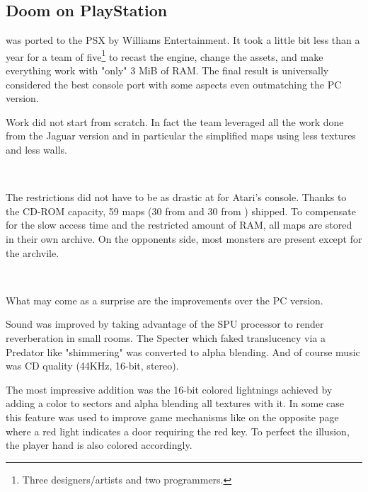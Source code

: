 \subsection{Doom on PlayStation}
\doom{} was ported to the PSX by Williams Entertainment. It took a little bit less than a year for a team of five\footnote{Three designers/artists and two programmers.} to recast the engine, change the assets, and make everything work with "only" 3 MiB of RAM. The final result is universally considered the best console port with some aspects even outmatching the PC version.\\
\par
Work did not start from scratch. In fact the team leveraged all the work done from the Jaguar version and in particular the simplified maps using less textures and less walls.\\
\par
{}\\
\par
  The restrictions did not have to be as drastic at for Atari's console. Thanks to the CD-ROM capacity, 59 maps (30 from \doom{} and 30 from \doomii{}) shipped. To compensate for the slow access time and the restricted amount of RAM, all maps are stored in their own  archive. On the opponents side, most monsters are present except for the archvile.\\
\par
{}\\
\par
What may come as a surprise are the improvements over the PC version.\\
\par
Sound was improved by taking advantage of the SPU processor to render reverberation in small rooms. The Specter which faked translucency via a Predator like  "shimmering" was converted to alpha blending. And of course music was CD quality (44KHz, 16-bit, stereo).\\
\par
 The most impressive addition was the 16-bit colored lightnings achieved by adding a color to sectors and alpha blending all textures with it. In some case this feature was used to improve game mechanisms like on the opposite page where a red light indicates a door requiring the red key. To perfect the illusion, the player hand is also colored accordingly.\\
\par


